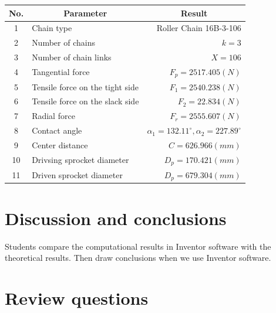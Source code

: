 \begin{table}[h!t]
	\centering
	\renewcommand{\arraystretch}{1.5}
	\begin{tabular}{clr}
		\toprule
		No. & \multicolumn{1}{c}{Parameter} & \multicolumn{1}{c}{Result}\\
		\midrule
		1 & Chain type & Roller Chain 16B-3-106\\
		2 & Number of chains & $ k=3 $\\
		3 & Number of chain links & $ X=106 $\\
		4 & Tangential force &$ F_p=2517.405\unit{(N)} $ \\
		5 & Tensile force on the tight side & $ F_1 =2540.238\unit{(N)}$\\
		6 & Tensile force on the slack side & $ F_2 = 22.834\unit{(N)} $\\
		7 & Radial force &$ F_r =2555.607\unit{(N)}$ \\
		8 & Contact angle & $ \alpha_1=132.11^\circ,\alpha_2=227.89^\circ $\\
		9 & Center distance &$ C= 626.966\unit{(mm)}$ \\
		10 & Drivsing sprocket diameter & $ D_{p} =170.421\unit{(mm)}$ \\
		11 & Driven sprocket diameter & $ D_{p} =679.304\unit{(mm)}$\\
		\bottomrule
	\end{tabular}
\end{table}


\section{Discussion and conclusions}
Students compare the computational results in Inventor software with the theoretical results. Then draw conclusions when we use Inventor software.
\section{Review questions}
